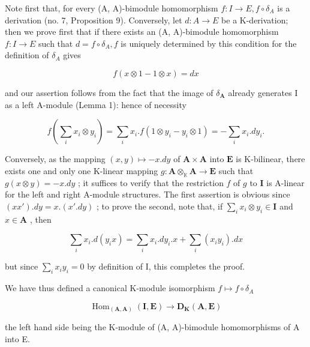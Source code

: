 Note first that, for every (A, A)-bimodule homomorphism \(f: I \to E, f \circ \delta_{A}\) is a derivation (no. 7, Proposition 9). Conversely, let \(d: A \to E\) be a K-derivation; then we prove first that if there exists an (A, A)-bimodule homomorphism \(f: I \to E\) such that \(d = f \circ \delta_{A}, f\) is uniquely determined by this condition for the definition of \(\delta_{A}\) gives

\[
f (x \otimes 1 - 1 \otimes x) = d x
\]

and our assertion follows from the fact that the image of \(\delta_{\mathbf{A}}\) already generates I as a left A-module (Lemma 1): hence of necessity

\[
f \left(\sum_ {i} x _ {i} \otimes y _ {i}\right) = \sum_ {i} x _ {i}. f (1 \otimes y _ {i} - y _ {i} \otimes 1) = - \sum_ {i} x _ {i}. d y _ {i}.
\]

Conversely, as the mapping \((x,y)\mapsto -x.dy\) of \(\mathbf{A}\times \mathbf{A}\) into \(\mathbf{E}\) is K-bilinear, there exists one and only one K-linear mapping \(g:\mathbf{A}\otimes_{\mathbb{K}}\mathbf{A}\rightarrow \mathbf{E}\) such that \(g(x\otimes y) = -x.dy\) ; it suffices to verify that the restriction \(f\) of \(g\) to \(\mathbf{I}\) is A-linear for the left and right A-module structures. The first assertion is obvious since \((xx') .dy = x.(x'.dy)\) ; to prove the second, note that, if \(\sum_{i}x_{i}\otimes y_{i}\in \mathbf{I}\) and \(x\in \mathbf{A}\) , then

\[
\sum_ {i} x _ {i}. d (y _ {i} x) = \sum_ {i} x _ {i}. d y _ {i}. x + \sum_ {i} (x _ {i} y _ {i}). d x
\]

but since \(\sum_{i}x_{i}y_{i} = 0\) by definition of I, this completes the proof.

We have thus defined a canonical K-module isomorphism \(f \mapsto f \circ \delta_{A}\)

\[
\operatorname{Hom} _ {(\mathbf {A}, \mathbf {A})} (\mathbf {I}, \mathbf {E}) \rightarrow \mathbf {D} _ {\mathbf {K}} (\mathbf {A}, \mathbf {E})
\]

the left hand side being the K-module of (A, A)-bimodule homomorphisms of A into E.
